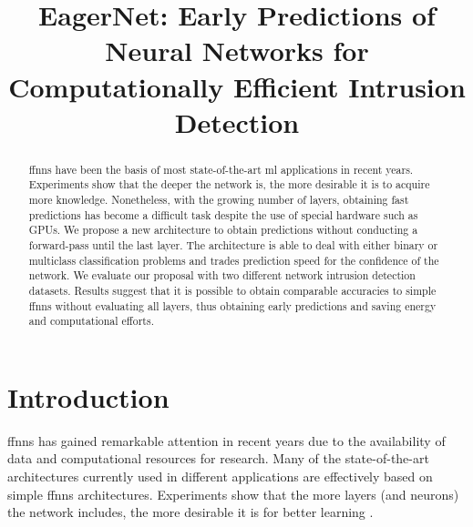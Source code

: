 \documentclass[conference]{IEEEtran}
\begin{document}
\title{EagerNet: Early Predictions of Neural Networks for Computationally Efficient Intrusion Detection}

\author{
}



\maketitle

\begin{abstract}

\glspl{ffnn} have been the basis of most state-of-the-art \gls{ml} applications in recent years. Experiments show that the deeper the network is, the more desirable it is to acquire more knowledge. Nonetheless, with the growing number of layers, obtaining fast predictions has become a difficult task despite the use of special hardware such as GPUs. We propose a new architecture to obtain predictions without conducting a forward-pass until the last layer. The architecture is able to deal with either binary or multiclass classification problems and trades prediction speed for the confidence of the network. We evaluate our proposal with two different network intrusion detection datasets. Results suggest that it is possible to obtain comparable accuracies to simple \glspl{ffnn} without evaluating all layers, thus obtaining early predictions and saving energy and computational efforts.

\end{abstract}

\begin{IEEEkeywords}

\end{IEEEkeywords}

\section{Introduction}
\glspl{ffnn} has gained remarkable attention in recent years due to the availability of data and computational resources for research. Many of the state-of-the-art architectures currently used in different applications are effectively based on simple \glspl{ffnn} architectures. Experiments show that the more layers (and neurons) the network includes, the more desirable it is for better learning \cite{eldan_power_2016}.
\end{document}
